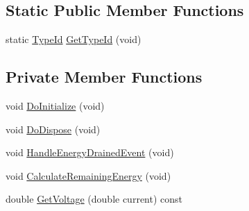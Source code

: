 \subsection*{Static Public Member Functions}
\begin{DoxyCompactItemize}
\item 
static \hyperlink{classns3_1_1TypeId}{Type\+Id} \hyperlink{classns3_1_1LiIonEnergySource_ae8939dafa5adcf6ad3528db1a479e829}{Get\+Type\+Id} (void)
\end{DoxyCompactItemize}
\subsection*{Private Member Functions}
\begin{DoxyCompactItemize}
\item 
void \hyperlink{classns3_1_1LiIonEnergySource_ab66c94318f6e0aefbd7fc295f31532f4}{Do\+Initialize} (void)
\item 
void \hyperlink{classns3_1_1LiIonEnergySource_a3687fbcb075b7ff5b261b0a4e3b12a08}{Do\+Dispose} (void)
\item 
void \hyperlink{classns3_1_1LiIonEnergySource_a9877b583fe62f4f4787e465b28cda8c8}{Handle\+Energy\+Drained\+Event} (void)
\item 
void \hyperlink{classns3_1_1LiIonEnergySource_a7df49ec678488cab1e5d57a2ee7e3ddb}{Calculate\+Remaining\+Energy} (void)
\item 
double \hyperlink{classns3_1_1LiIonEnergySource_ab27fe1a4814c0c1a4d67936c6c2b141f}{Get\+Voltage} (double current) const 
\end{DoxyCompactItemize}
